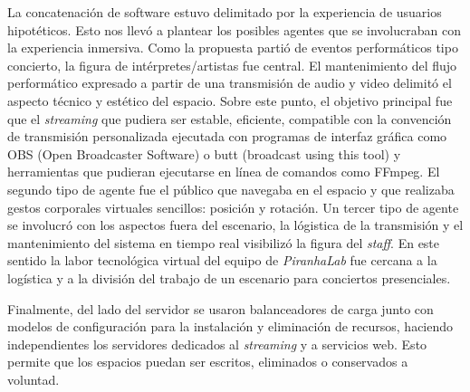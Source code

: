 

La concatenación de software estuvo delimitado por la experiencia de usuarios hipotéticos. Esto nos llevó a plantear los posibles agentes que se involucraban con la experiencia inmersiva. Como la propuesta partió de eventos performáticos tipo concierto, la figura de intérpretes/artistas fue central. El mantenimiento del flujo performático expresado a partir de una transmisión de audio y video delimitó el aspecto técnico y estético del espacio. Sobre este punto, el objetivo principal fue que el \textit{streaming} que pudiera ser estable, eficiente, compatible con la convención de transmisión personalizada ejecutada con programas de interfaz gráfica como OBS (Open Broadcaster Software) o butt (broadcast using this tool) y herramientas que pudieran ejecutarse en línea de comandos como FFmpeg. El segundo tipo de agente fue el público que navegaba en el espacio y que realizaba gestos corporales virtuales sencillos: posición y rotación. Un tercer tipo de agente se involucró con los aspectos fuera del escenario, la lógistica de la transmisión y el mantenimiento del sistema en tiempo real visibilizó la figura del \textit{staff}. En este sentido la labor tecnológica virtual del equipo de \textit{PiranhaLab} fue cercana a la logística y a la división del trabajo de un escenario para conciertos presenciales. 


Finalmente, del lado del servidor se usaron balanceadores de carga junto con modelos de configuración para la instalación y eliminación de recursos, haciendo independientes los servidores dedicados al \textit{streaming} y a servicios web. Esto permite que los espacios puedan ser escritos, eliminados o conservados a voluntad. 
